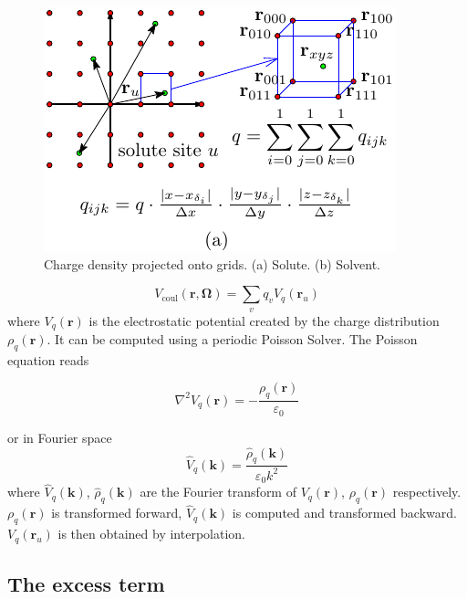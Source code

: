 \begin{figure}[h]
\begin{centering}
\includegraphics{_figure/charge_int}
\par\end{centering}
\caption{Charge density projected onto grids\label{fig:Charge-density-projected}.
(a) Solute. (b) Solvent.}
\end{figure}

\begin{equation}
V_{\mathrm{coul}}(\mathbf{r},\mathbf{\Omega})=\sum_{v}q_{v}V_{q}(\mathbf{r}_{u})
\end{equation}
where $V_{q}(\mathbf{r})$ is the electrostatic potential created
by the charge distribution $\rho_{q}(\mathbf{r})$. It can be computed
using a periodic Poisson Solver. The Poisson equation reads

\begin{equation}
\nabla^{2}V_{q}(\mathbf{r})=-\frac{\rho_{q}(\mathbf{r})}{\varepsilon_{0}}
\end{equation}

or in Fourier space
\begin{equation}
\hat{V}_{q}(\mathbf{k})=\frac{\hat{\rho}_{q}(\mathbf{k})}{\varepsilon_{0}k^{2}}
\end{equation}
where $\hat{V}_{q}(\mathbf{k})$, $\hat{\rho}_{q}(\mathbf{k})$ are
the Fourier transform of $V_{q}(\mathbf{r})$, $\rho_{q}(\mathbf{r})$
respectively. $\rho_{q}(\mathbf{r})$ is transformed forward, $\hat{V}_{q}(\mathbf{k})$
is computed and transformed backward. $V_{q}(\mathbf{r}_{u})$ is
then obtained by interpolation. 

\subsection{The excess term}

